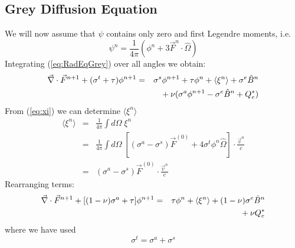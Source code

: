 \documentclass{article}
\newcommand{\Bn}{\ensuremath{\hat{B}^{n}}}
\begin{document}
\subsection{Grey Diffusion Equation}

We will now assume that $\psi$ contains only zero and first Legendre moments,
i.e.\ 
\begin{equation}
	\psi^{n} = \frac{1}{4\pi} \left(
			\phi^{n} + 3 \vec{F}^{n} \cdot \hat{\Omega}
		   \right)
\end{equation}
Integrating (\ref{eq:RadEqGrey}) over all angles
we obtain:
\begin{eqnarray}
\del \cdot \vec{F}^{n+1} + (\sigma^{t} + \tau) \phi^{n+1}
	&=& \sigma^{s}\phi^{n+1} + \tau \phi^{n}
	+ \langle \xi^{n} \rangle
	+ \sigma^{e} \Bn 
	\nonumber \\
	& & \mbox{}
	+ \nu (\sigma^{a}\phi^{n+1} - \sigma^{e}\Bn + Q_{e}^{*})
\end{eqnarray}
From (\ref{eq:xi}) we can determine $\langle \xi^{n} \rangle$
\begin{eqnarray}
	\langle \xi^{n} \rangle &=&
		\frac{1}{4\pi} \int d\Omega \; \xi^{n}
		\\
		&=& \frac{1}{4\pi} \int d\Omega \;
		    \left[ (\sigma^{a} - \sigma^{s}) \vec{F}^{(0)}
			+ 4 \sigma^{t} \phi^{n} \hat{\Omega} \right]
				\cdot \frac{\vec{v}^{n}}{c}
		\\
		 &=& (\sigma^{a} - \sigma^{s}) \vec{F}^{(0)}
			\cdot \frac{\vec{v}^{n}}{c}
\label{eq:l_xi_r}
\end{eqnarray}
Rearranging terms:
\begin{eqnarray}
\del \cdot \vec{F}^{n+1} + [(1 - \nu) \sigma^{a} + \tau ] \phi^{n+1}
	&=& \tau \phi^{n}
	+ \langle \xi^{n} \rangle
	+ (1 - \nu) \sigma^{e} \Bn  
	\nonumber \\
	& & \mbox{}
	+ \nu Q_{e}^{*}
\label{eq:phiEq}
\end{eqnarray}
where we have used
\begin{equation}
	\sigma^{t} = \sigma^{a} + \sigma^{s}
\end{equation}
\end{document}
